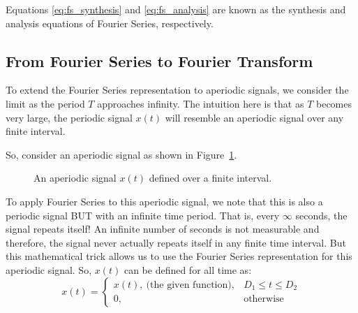 \documentclass{ee102_notes}
\begin{document}
Equations \eqref{eq:fs_synthesis} and \eqref{eq:fs_analysis} are known as the synthesis and analysis equations of Fourier Series, respectively. 

\subsection{From Fourier Series to Fourier Transform}
To extend the Fourier Series representation to aperiodic signals, we consider the limit as the period $T$ approaches infinity. The intuition here is that as $T$ becomes very large, the periodic signal $x(t)$ will resemble an aperiodic signal over any finite interval.

So, consider an aperiodic signal as shown in Figure~\ref{fig:aperiodic_signal}. 

\begin{figure}[h!]
    \centering
    \caption{An aperiodic signal $x(t)$ defined over a finite interval.}
    \label{fig:aperiodic_signal}
\end{figure}

To apply Fourier Series to this aperiodic signal, we note that this is also a periodic signal BUT with an infinite time period. That is, every $\infty$ seconds, the signal repeats itself! An infinite number of seconds is not measurable and therefore, the signal never actually repeats itself in any finite time interval. But this mathematical trick allows us to use the Fourier Series representation for this aperiodic signal. So, $x(t)$ can be defined for all time as:
\[
x(t) = \begin{cases}
    x(t), \: \text{(the given function)}, & D_1 \leq t \leq D_2 \\
    0, & \text{otherwise}
\end{cases}
\]
\end{document}
